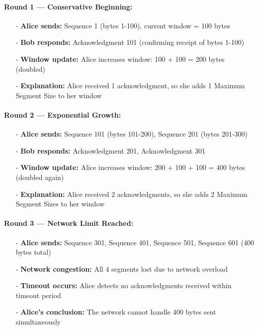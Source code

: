 \documentclass[../../compsys.tex]{subfiles}
\begin{document}
\paragraph{Round 1 — Conservative Beginning:}
\begin{itemize}
  \item[-] \textbf{Alice sends:} Sequence 1 (bytes 1-100), current window = 100 bytes
  \item[-] \textbf{Bob responds:} Acknowledgment 101 (confirming receipt of bytes 1-100)
  \item[-] \textbf{Window update:} Alice increases window: 100 + 100 = 200 bytes (doubled)
  \item[-] \textbf{Explanation:} Alice received 1 acknowledgment, so she adds 1 Maximum Segment Size to her window
\end{itemize}

\paragraph{Round 2 — Exponential Growth:}
\begin{itemize}
  \item[-] \textbf{Alice sends:} Sequence 101 (bytes 101-200), Sequence 201 (bytes 201-300)
  \item[-] \textbf{Bob responds:} Acknowledgment 201, Acknowledgment 301
  \item[-] \textbf{Window update:} Alice increases window: 200 + 100 + 100 = 400 bytes (doubled again)
  \item[-] \textbf{Explanation:} Alice received 2 acknowledgments, so she adds 2 Maximum Segment Sizes to her window
\end{itemize}

\paragraph{Round 3 — Network Limit Reached:}
\begin{itemize}
  \item[-] \textbf{Alice sends:} Sequence 301, Sequence 401, Sequence 501, Sequence 601 (400 bytes total)
  \item[-] \textbf{Network congestion:} All 4 segments lost due to network overload
  \item[-] \textbf{Timeout occurs:} Alice detects no acknowledgments received within timeout period
  \item[-] \textbf{Alice's conclusion:} The network cannot handle 400 bytes sent simultaneously
\end{itemize}
\end{document}
